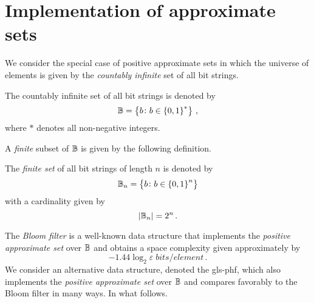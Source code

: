 \documentclass[ ../main.tex]{subfiles}
\begin{document}
\section{Implementation of approximate sets}
\label{sec:phf}
We consider the special case of positive approximate sets in which the universe of elements is given by the \emph{countably infinite} set of all bit strings.
\begin{definition}
The countably infinite set of all bit strings is denoted by
\begin{equation}
    \mathbb{B} = \left\{b \colon b \in \left\{0,1\right\}^*\right\}\,,
\end{equation}
where $*$ denotes all non-negative integers.
\end{definition}
A \emph{finite} subset of $\mathbb{B}$ is given by the following definition.
\begin{definition}
The \emph{finite set} of all bit strings of length $n$ is denoted by
\begin{equation}
    \mathbb{B}_n = \left\{b \colon b \in \left\{0,1\right\}^n\right\}
\end{equation}
with a cardinality given by
\begin{equation}
    \left\vert{\mathbb{B}_n}\right\vert = 2^n\,.
\end{equation}
\end{definition}

The \emph{Bloom filter}\cite{bf} is a well-known data structure that implements the \emph{positive approximate set} over $\mathbb{B}$ and obtains a space complexity given approximately by
\begin{equation}
    -1.44 \log_2 \varepsilon \; \si{bits \per element}\,.
\end{equation}
We consider an alternative data structure, denoted the \gls{gls-phf}, which also implements the \emph{positive approximate set} over $\mathbb{B}$ and compares favorably to the Bloom filter in many ways. In what follows.
\end{document}
